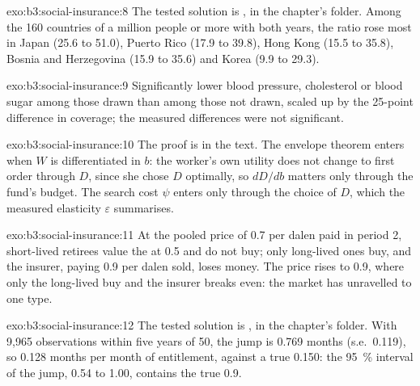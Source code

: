 \begin{solution}{exo:b3:social-insurance:8}
The tested solution is , in the chapter's 
folder. Among the 160 countries of a million people or more with both years, the
ratio rose most in Japan (25.6 to 51.0), Puerto Rico (17.9 to 39.8), Hong Kong (15.5 to
35.8), Bosnia and Herzegovina (15.9 to 35.6) and Korea (9.9 to 29.3).
\end{solution}

\begin{solution}{exo:b3:social-insurance:9}
Significantly lower blood pressure, cholesterol or blood sugar among those drawn
than among those not drawn, scaled up by the 25-point difference in coverage;
the measured differences were not significant.
\end{solution}

\begin{solution}{exo:b3:social-insurance:10}
The proof is in the text. The envelope theorem enters when $W$ is differentiated in
$b$: the worker's own utility does not change to first order through $D$, since she
chose $D$ optimally, so $dD/db$ matters only through the fund's budget. The search cost
$\psi$ enters only through the choice of $D$, which the measured elasticity $\varepsilon$ summarises.
\end{solution}

\begin{solution}{exo:b3:social-insurance:11}
At the pooled price of 0.7 per dalen paid in period 2, short-lived retirees value the
 at 0.5 and do not buy; only long-lived ones buy, and the insurer, paying 0.9
per dalen sold, loses money. The price rises to 0.9, where only the long-lived buy
and the insurer breaks even: the market has unravelled to one type.
\end{solution}

\begin{solution}{exo:b3:social-insurance:12}
The tested solution is , in the chapter's 
folder. With 9{,}965 observations within five years of 50, the jump is 0.769 months
(s.e.\ 0.119), so 0.128 months per month of entitlement, against a true 0.150: the
95~\% interval of the jump, 0.54 to 1.00, contains the true 0.9. %
\end{solution}

